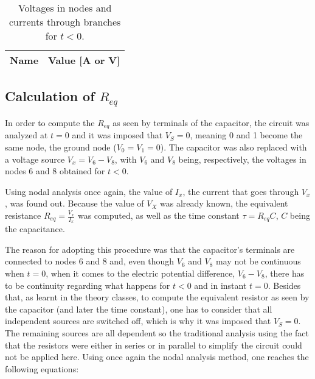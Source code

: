
\begin{table}[H]
  \centering
  \begin{tabular}{|c|c|}
    \hline    
    {\bf Name} & {\bf Value [A or V]} \\ \hline
    
  \end{tabular}
  \caption{Voltages in nodes and currents through branches for $t<0$.}
  \label{tab:t<0}
\end{table}



\subsection{Calculation of $R_{eq}$} %
In order to compute the $R_{eq}$ as seen by terminals of the capacitor, the circuit was analyzed at $t = 0$ and it was imposed that $V_S=0$, meaning 0 and 1 become the same node, the ground node ($V_0=V_1=0$). The capacitor was also replaced with a voltage source $V_x=V_6-V_8$, with $V_6$ and $V_8$ being, respectively, the voltages in nodes 6 and 8 obtained for $t<0$.
\par
Using nodal analysis once again, the value of $I_x$, the current that goes through $V_x$, was found out. Because the value of $V_X$ was already known, the equivalent resistance $R_{eq} = \frac{V_x}{I_x}$ was computed, as well as the time constant $\tau = R_{eq}C$, $C$ being the capacitance.
\par
The reason for adopting this procedure was that the capacitor's terminals are connected to nodes 6 and 8 and, even though $V_6$ and $V_8$ may not be continuous when $t=0$, when it comes to the electric potential difference, $V_6-V_8$, there has to be continuity regarding what happens for $t<0$ and in instant $t=0$. Besides that, as learnt in the theory classes, to compute the equivalent resistor as seen by the capacitor (and later the time constant), one has to consider that all independent sources are switched off, which is why it was imposed that $V_S=0$. The remaining sources are all dependent so the traditional analysis using the fact that the resistors were either in series or in parallel to simplify the circuit could not be applied here.
Using once again the nodal analysis method, one reaches the following equations:

